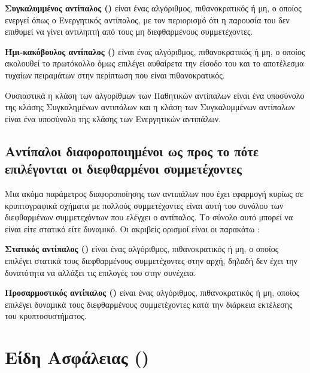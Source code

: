 \begin{definition}
\textbf{Συγκαλυμμένος αντίπαλος ()} είναι ένας αλγόριθμος, πιθανοκρατικός ή μη, ο οποίος ενεργεί όπως ο Ενεργητικός αντίπαλος, με τον περιορισμό ότι η παρουσία του δεν επιθυμεί να γίνει αντιληπτή από τους μη διεφθαρμένους συμμετέχοντες.
\end{definition}

\begin{definition}
\textbf{Ημι-κακόβουλος αντίπαλος ()} είναι ένας αλγόριθμος, πιθανοκρατικός ή μη, ο οποίος ακολουθεί το πρωτόκολλο όμως επιλέγει αυθαίρετα την είσοδο του και το αποτέλεσμα τυχαίων πειραμάτων στην περίπτωση που είναι πιθανοκρατικός.
\end{definition}

Ουσιαστικά η κλάση των αλγορίθμων των Παθητικών αντίπαλων είναι ένα υποσύνολο της κλάσης Συγκαλημένων αντιπάλων και η κλάση των Συγκαλυμμένων αντίπαλων είναι ένα υποσύνολο της κλάσης των Ενεργητικών αντιπάλων.

\subsection{Αντίπαλοι διαφοροποιημένοι ως προς το πότε επιλέγονται οι διεφθαρμένοι συμμετέχοντες}

Μια ακόμα παράμετρος διαφοροποίησης των αντιπάλων που έχει εφαρμογή κυρίως σε κρυπτογραφικά σχήματα με πολλούς συμμετέχοντες είναι αυτή του συνόλου των διεφθαρμένων συμμετεχόντων που ελέγχει ο αντίπαλος. Το σύνολο αυτό μπορεί να είναι είτε στατικό είτε δυναμικό. Οι ακριβείς ορισμοί είναι οι παρακάτω :

\begin{definition}
\textbf{Στατικός αντίπαλος ()} είναι ένας αλγόριθμος, πιθανοκρατικός ή μη, ο οποίος επιλέγει στατικά τους διεφθαρμένους συμμετέχοντες στην αρχή, δηλαδή δεν έχει την δυνατότητα να αλλάξει τις επιλογές του στην συνέχεια.
\end{definition}

\begin{definition}
\textbf{Προσαρμοστικός αντίπαλος ()} είναι ένας αλγόριθμος, πιθανοκρατικός ή μη, οποίος επιλέγει δυναμικά τους διεφθαρμένους συμμετέχοντες κατά την διάρκεια εκτέλεσης του κρυπτοσυστήματος.
\end{definition}


\section{Είδη Ασφάλειας ()}

